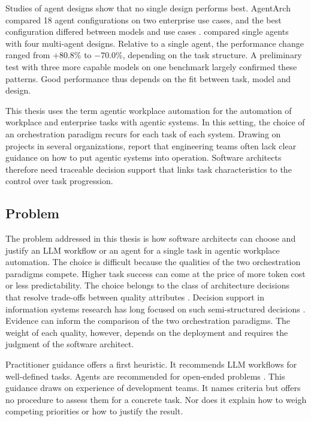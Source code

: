 Studies of agent designs show that no single design performs best. AgentArch compared 18 agent configurations on two enterprise use cases, and the best configuration differed between models and use cases \parencite{bogavelliAgentArchComprehensiveBenchmark2025}. \textcite{kimScienceScalingAgent2025} compared single agents with four multi-agent designs. Relative to a single agent, the performance change ranged from $+80.8$\% to $-70.0$\%, depending on the task structure. A preliminary test with three more capable models on one benchmark largely confirmed these patterns. Good performance thus depends on the fit between task, model and design.

This thesis uses the term agentic workplace automation for the automation of workplace and enterprise tasks with agentic systems. In this setting, the choice of an orchestration paradigm recurs for each task of each system. Drawing on projects in several organizations, \textcite{bandaraPracticalGuideAgentic2026} report that engineering teams often lack clear guidance on how to put agentic systems into operation. Software architects therefore need traceable decision support that links task characteristics to the control over task progression. 

\subsection{Problem}
\label{subsec:intro/problem}
The problem addressed in this thesis is how software architects can choose and justify an LLM workflow or an agent for a single task in agentic workplace automation. The choice is difficult because the qualities of the two orchestration paradigms compete. Higher task success can come at the price of more token cost or less predictability. The choice belongs to the class of architecture decisions that resolve trade-offs between quality attributes \parencite{falessiDecisionmakingTechniquesSoftware2011}. Decision support in information systems research has long focused on such semi-structured decisions \parencite{spragueFrameworkDevelopmentDecision1980}. Evidence can inform the comparison of the two orchestration paradigms. The weight of each quality, however, depends on the deployment and requires the judgment of the software architect.
 
Practitioner guidance offers a first heuristic. It recommends LLM workflows for well-defined tasks. Agents are recommended for open-ended problems  \parencite{schluntzBuildingEffectiveAI2024}. This guidance draws on experience of development teams. It names criteria but offers no procedure to assess them for a concrete task. Nor does it explain how to weigh competing priorities or how to justify the result.
 

